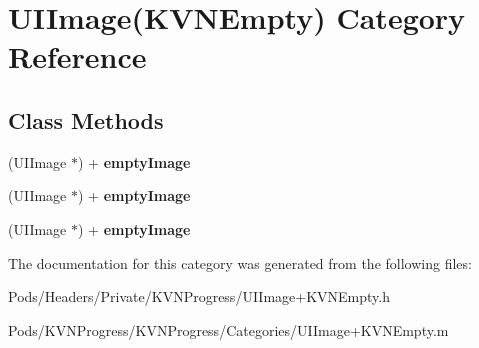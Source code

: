 \hypertarget{category_u_i_image_07_k_v_n_empty_08}{}\section{U\+I\+Image(K\+V\+N\+Empty) Category Reference}
\label{category_u_i_image_07_k_v_n_empty_08}
\subsection*{Class Methods}
\begin{DoxyCompactItemize}
\item 
\mbox{\label{category_u_i_image_07_k_v_n_empty_08_a5d4ab8a51f211ddbf812fb5bb615edae}} 
(U\+I\+Image $\ast$) + {\bfseries empty\+Image}
\item 
\mbox{\label{category_u_i_image_07_k_v_n_empty_08_a5d4ab8a51f211ddbf812fb5bb615edae}} 
(U\+I\+Image $\ast$) + {\bfseries empty\+Image}
\item 
\mbox{\label{category_u_i_image_07_k_v_n_empty_08_a5d4ab8a51f211ddbf812fb5bb615edae}} 
(U\+I\+Image $\ast$) + {\bfseries empty\+Image}
\end{DoxyCompactItemize}


The documentation for this category was generated from the following files\+:\begin{DoxyCompactItemize}
\item 
Pods/\+Headers/\+Private/\+K\+V\+N\+Progress/U\+I\+Image+\+K\+V\+N\+Empty.\+h\item 
Pods/\+K\+V\+N\+Progress/\+K\+V\+N\+Progress/\+Categories/U\+I\+Image+\+K\+V\+N\+Empty.\+m\end{DoxyCompactItemize}
